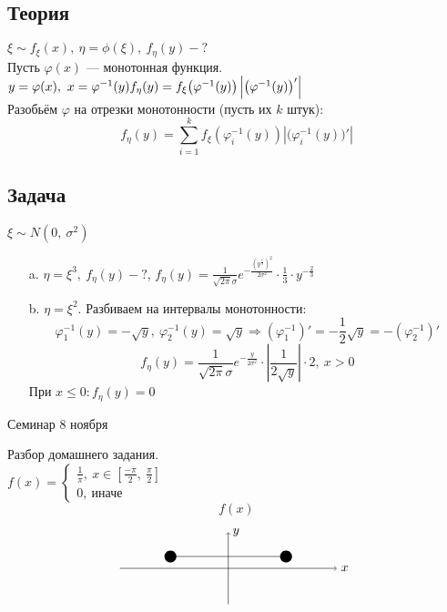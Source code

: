 \documentclass[12pt, a4paper]{article}
\begin{document}
    \subsection*{Теория}
    $\xi \sim f_{\xi} (x),\ \eta = \phi(\xi),\ f_{\eta}(y) - ?$\\
    Пусть $\varphi(x)$ --- монотонная функция. $y = \varphi(x),\ x = \varphi^{-1}(y)\\
    f_{\eta}(y) = f_{\xi} \big( \varphi^{-1}(y) \big) \left| \big(\varphi^{-1}(y)\big)' \right|$\\
    Разобьём $\varphi$ на отрезки монотонности (пусть их $k$ штук):
    \[f_{\eta}(y) = \sum_{i = 1}^{k} f_{\xi}\left( \varphi^{-1}_{i}(y) \right)\left| \big(\varphi^{-1}_i(y)\big)' \right|\]
    \subsection*{Задача}
    $\xi\sim N(0,\ \sigma^2)$
    \begin{enumerate}
        \item[a.] $\eta = \xi^3,\ f_{\eta}(y) -?$, $f_{\eta}(y) = \frac{1}{\sqrt{2\pi} \sigma}e^{-\frac{\left( y^{\frac{1}{3}}\right)^2}{2\sigma^2}}\cdot \frac{1}{3}\cdot y^{-\frac{2}{3}} $
        \item[b.] $\eta = \xi^2$. Разбиваем на интервалы монотонности:
        \[\varphi_1^{-1}(y) = -\sqrt{y},\ \varphi_2^{-1}(y) = \sqrt{y}\Rightarrow \left(\varphi_1^{-1}\right)' = -\frac{1}{2}\sqrt{y} = -\left(\varphi_2^{-1}\right)'\]
        \[f_{\eta}(y) = \frac{1}{\sqrt{2\pi}\sigma} e^{-\frac{y}{2\sigma^2}} \cdot \left| \frac{1}{2\sqrt{y}} \right|\cdot 2,\ x > 0\]
        При $x \leq 0: f_{\eta}(y) = 0$
    \end{enumerate}
    \begin{center}
        Семинар 8 ноября
    \end{center}
    Разбор домашнего задания.\\
    $f(x) = \begin{cases}
        \frac{1}{\pi},\ x\in [\frac{-\pi}{2},\ \frac{\pi}{2}]\\
        0,\ \text{иначе}
    \end{cases}$\\
    \[f(x)\]\[\begin{tikzpicture}[every circle node/.style={fill, minimum width=0.25mm}]
        \draw[->] (-3, 0) -- (3, 0) node[anchor=west]{$x$};
        \draw[->] (0, -1) -- (0, 1) node[anchor=west]{$y$};
        \draw (-1.6, 0.33) node[circle]{} -- (1.6, 0.33) node[circle]{};
    \end{tikzpicture}\]
\end{document}
